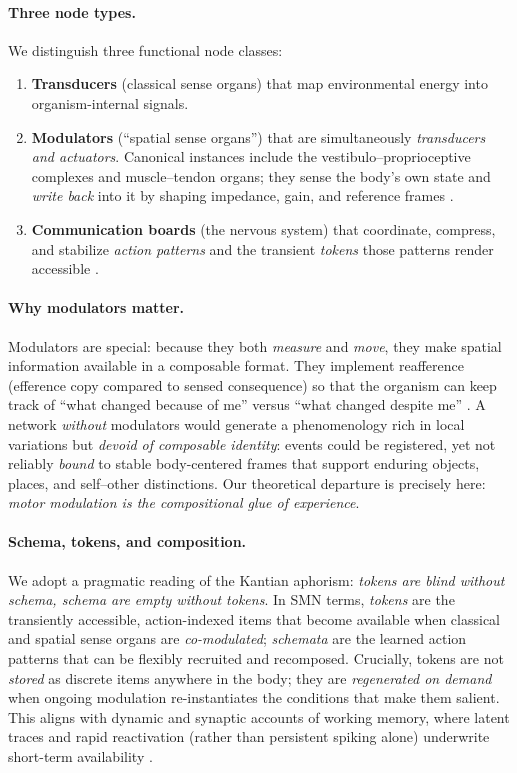 \paragraph{Three node types.}
We distinguish three functional node classes:
\begin{enumerate}
  \item \textbf{Transducers} (classical sense organs) that map environmental energy into organism-internal signals.
  \item \textbf{Modulators} (``spatial sense organs'') that are simultaneously \emph{transducers and actuators}. Canonical instances include the vestibulo–proprioceptive complexes and muscle–tendon organs; they sense the body's own state and \emph{write back} into it by shaping impedance, gain, and reference frames \citep{ProskeGandevia2012,Cullen2019}.
  \item \textbf{Communication boards} (the nervous system) that coordinate, compress, and stabilize \emph{action patterns} and the transient \emph{tokens} those patterns render accessible \citep{MongilloEtAl2008,Stokes2015,Postle2016}.
\end{enumerate}

\paragraph{Why modulators matter.}
Modulators are special: because they both \emph{measure} and \emph{move}, they make spatial information available in a composable format. They implement reafference (efference copy compared to sensed consequence) so that the organism can keep track of ``what changed because of me'' versus ``what changed despite me'' \citep{vonHolstMittelstaedt1950,CrapseSommer2008}. A network \emph{without} modulators would generate a phenomenology rich in local variations but \emph{devoid of composable identity}: events could be registered, yet not reliably \emph{bound} to stable body-centered frames that support enduring objects, places, and self–other distinctions. Our theoretical departure is precisely here: \emph{motor modulation is the compositional glue of experience}.

\paragraph{Schema, tokens, and composition.}
We adopt a pragmatic reading of the Kantian aphorism: \emph{tokens are blind without schema, schema are empty without tokens}. In SMN terms, \emph{tokens} are the transiently accessible, action-indexed items that become available when classical and spatial sense organs are \emph{co-modulated}; \emph{schemata} are the learned action patterns that can be flexibly recruited and recomposed. Crucially, tokens are not \emph{stored} as discrete items anywhere in the body; they are \emph{regenerated on demand} when ongoing modulation re-instantiates the conditions that make them salient. This aligns with dynamic and synaptic accounts of working memory, where latent traces and rapid reactivation (rather than persistent spiking alone) underwrite short-term availability \citep{MongilloEtAl2008,Stokes2015,Postle2016}.

